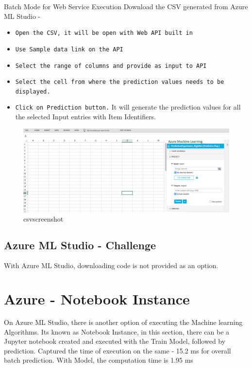 Batch Mode for Web Service Execution
Download the CSV generated from Azure ML Studio -
\begin{itemize}
\item \verb|Open the CSV, it will be open with Web API built in|
\item \verb|Use Sample data link on the API|
\item \verb|Select the range of columns and provide as input to API|
\item \verb|Select the cell from where the prediction values needs to be displayed.|
\item \verb|Click on Prediction button.|
It will generate the prediction values for all the selected Input entries with Item Identifiers.
\end{itemize}

\begin{figure}[pic9]
	\centering\includegraphics[width=\columnwidth]{Images/mlstudio/csvscreenshot.png}
	\caption{csvscreenshot}\label{fig:csvscreenshot}
\end{figure}

\subsection{Azure ML Studio - Challenge}
With Azure ML Studio, downloading code is not provided as an option.

\section{Azure - Notebook Instance}

On Azure ML Studio, there is another option of executing the Machine learning Algorithms.
Its known as Notebook Instance, in this section, there can be a Jupyter notebook created and 
executed with the Train Model, followed by prediction.
Captured the time of execution on the same - 15.2 ms for overall batch prediction.
With Model, the computation time is 1.95 ms

